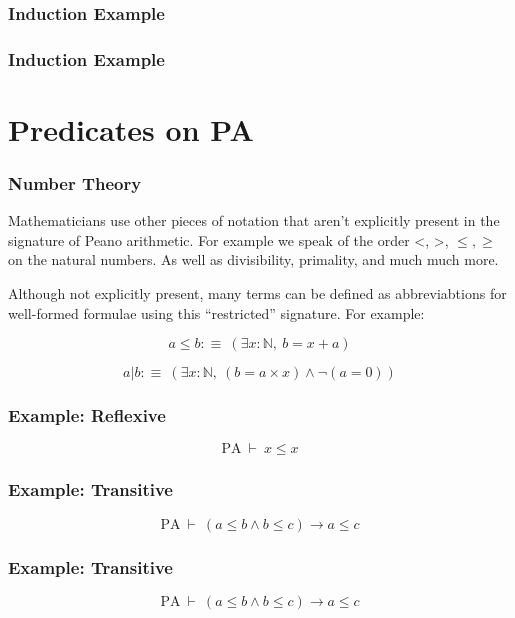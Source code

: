 \documentclass{beamer}
\theoremstyle{indentDefn} \newtheorem{defn}[]{Definition}
\begin{document}
\begin{frame}
	\frametitle{Induction Example}

	

\end{frame}

\begin{frame}
	\frametitle{Induction Example}

	

\end{frame}

\section{Predicates on PA}

\begin{frame}
	\frametitle{Number Theory}

	Mathematicians use other pieces of notation that aren't explicitly present in the signature of Peano arithmetic. For example we speak of the order <, >, $\leq, \geq$ on the natural numbers. As well as divisibility, primality, and much much more. 

	Although not explicitly present, many terms can be defined as abbreviabtions for well-formed formulae using this ``restricted'' signature. For example: 

	$$ a \leq b :\equiv \ (\exists x : \mathbb{N}, \ b = x + a)$$

	$$ a | b :\equiv \ (\exists x : \mathbb{N}, \ (b = a \times x) \land \lnot(a = 0))$$
\end{frame}

\begin{frame}
	\frametitle{Example: Reflexive}

	$$\text{PA} \ \vdash \ x \leq x$$

	\vspace{6cm}

\end{frame}

\begin{frame}
	\frametitle{Example: Transitive}

	$$\text{PA} \ \vdash \ (a \leq b \land b \leq c) \to a \leq c$$

	\vspace{6cm}

\end{frame}

\begin{frame}
	\frametitle{Example: Transitive}

	$$\text{PA} \ \vdash \ (a \leq b \land b \leq c) \to a \leq c$$

	\vspace{6cm}

\end{frame}
\end{document}
